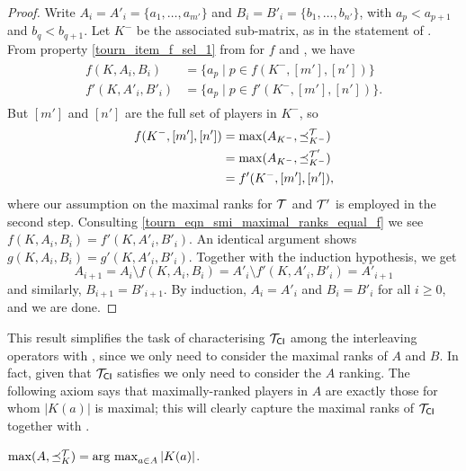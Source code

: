 \begin{proof}
    Write $A_i = A'_i = \{a_1, \ldots, a_{m'}\}$ and $B_i = B'_i =
    \{b_1, \ldots, b_{n'}\}$, with $a_p < a_{p+1}$ and $b_q < b_{q+1}$. Let
    $K^-$ be the associated sub-matrix, as in the statement of \smi{}.
    From property \cref{tourn_item_f_sel_1} from
     for $f$ and \smi{}, we have
    \begin{align}
        \label{tourn_eqn_smi_maximal_ranks_equal_f}
        \begin{split}
            f(K, A_i, B_i) &= \{a_p \mid p \in f(K^-, [m'], [n'])\} \\
            f'(K, A'_i, B'_i) &= \{a_p \mid p \in f'(K^-, [m'], [n'])\}.
        \end{split}
    \end{align}
    But $[m']$ and $[n']$ are the full set of players in $K^-$, so
    \begin{align*}
        f(K^-, [m'], [n'])
        &= \max(A_{K^-}, {\preceq_{K^-}^{\mathcal{T}}}) \\
        &= \max(A_{K^-}, {\preceq_{K^-}^{\mathcal{T}'}}) \\
        &= f'(K^-, [m'], [n']),
    \end{align*}
    where our assumption on the maximal ranks for $\mathcal{T}$ and $\mathcal{T}'$ is
    employed in the second step. Consulting
    \cref{tourn_eqn_smi_maximal_ranks_equal_f} we see $f(K, A_i, B_i) =
    f'(K, A'_i, B'_i)$. An identical argument shows $g(K, A_i, B_i) = g'(K,
    A'_i, B'_i)$. Together with the induction hypothesis, we get
    \[
        A_{i + 1}
        = A_i \setminus f(K, A_i, B_i)
        = A'_i \setminus f'(K, A'_i, B'_i)
        = A'_{i + 1}
    \]
    and similarly, $B_{i + 1} = B'_{i + 1}$. By induction, $A_i = A'_i$ and
    $B_i = B'_i$ for all $i \ge 0$, and we are done.
\end{proof}

This result simplifies the task of characterising ${\mathcal{T}_{\mathsf{CI}}}$ among the
interleaving operators with \smi{}, since we only need to consider the
maximal ranks of $A$ and $B$. In fact, given that ${\mathcal{T}_{\mathsf{CI}}}$ satisfies
\dualaxiom{} we only need to consider the $A$ ranking. The following axiom
says that maximally-ranked players in $A$ are exactly those for whom $|K(a)|$
is maximal; this will clearly capture the maximal ranks of ${\mathcal{T}_{\mathsf{CI}}}$
together with \dualaxiom{}.

\begin{axiom}[\argmaxaxiom{}]
    $\max(A, {\preceq_K^{\mathcal{T}}}) = \operatorname*{arg\ max}_{a \in A}{|K(a)|}$.
\end{axiom}

